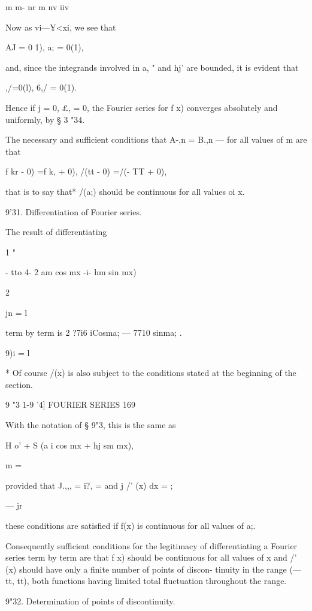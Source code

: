 m m- nr m nv iiv

Now as vi—¥<xi, we see that

AJ = 0 1), a; = 0(1),

and, since the integrands involved in a, " and hj' are bounded, it is
evident that

 ,/=0(l), 6,/ = 0(1).

Hence if j = 0, £, = 0, the Fourier series for f x) converges
absolutely and uniformly, by § 3 "34.

The necessary and sufficient conditions that A-,n = B.,n — for all
values of m are that

f kr - 0) =f k, + 0), /(tt - 0) =/(- TT + 0),

that is to say that* /(a;) should be continuous for all values oi x.

9'31. Differentiation of Fourier series.

The result of differentiating

1 "

- tto 4- 2 am cos mx -i- hm sin mx)



2



jn = l



term by term is 2 ?7i6 iCosma; — 7710 sinma; .

9)i = l

* Of course /(x) is also subject to the conditions stated at the
beginning of the section.



9 "3 1-9 '4] FOURIER SERIES 169

With the notation of § 9"3, this is the same as

H o' + S (a i cos mx + hj sm mx),

  m = \

provided that J.,,, = i?, = and j /' (x) dx = ;

— jr

these conditions are satisfied if f(x) is continuous for all values of
a;.

Consequently sufficient conditions for the legitimacy of
differentiating a Fourier series term by term are that f x) should be
continuous for all values of x and /' (x) should have only a finite
number of points of discon- tinuity in the range (— tt, tt), both
functions having limited total fluctuation throughout the range.

9"32. Determination of points of discontinuity.

